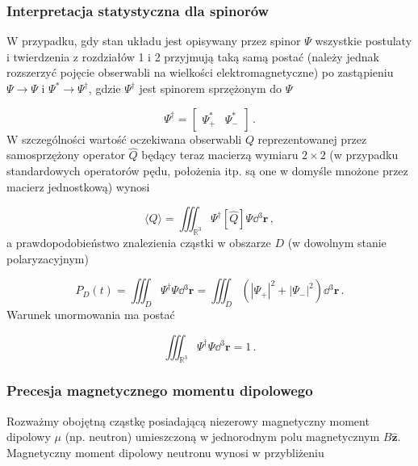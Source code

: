 \documentclass{myclass}
\begin{document}
\subsubsection{Interpretacja statystyczna dla spinorów}

W przypadku, gdy stan układu jest opisywany przez spinor \(\mathsf{\Psi}\) wszystkie postulaty i
twierdzenia z rozdziałów 1 i 2 przyjmują taką samą postać (należy jednak rozszerzyć pojęcie
obserwabli na wielkości elektromagnetyczne) po zastąpieniu \(\Psi\to\mathsf{\Psi}\) i
\(\Psi^*\to\mathsf{\Psi}^\dag\), gdzie \(\mathsf{\Psi}^\dag\) jest spinorem sprzężonym do
\(\mathsf{\Psi}\)

\begin{equation*}
\mathsf{\Psi}^\dag=\begin{bmatrix}
\Psi_+^* & \Psi_-^*
\end{bmatrix}\,.
\end{equation*}
W szczególności wartość oczekiwana obserwabli \(Q\) reprezentowanej przez samosprzężony operator
\(\hat{Q}\) będący teraz macierzą wymiaru \(2\times 2\) (w przypadku standardowych operatorów pędu,
położenia itp. są one w domyśle mnożone przez macierz jednostkową) wynosi

\begin{equation*}
\langle Q\rangle=\iiint_{\mathbb{R}^3}\mathsf{\Psi}^\dag[\hat{Q}]\mathsf{\Psi}\dd{^3\mathbf{r}}\,,
\end{equation*}
a prawdopodobieństwo znalezienia cząstki w obszarze \(D\) (w dowolnym stanie polaryzacyjnym)

\begin{equation*}
P_D(t)=\iiint_{D}\mathsf{\Psi}^\dag\mathsf{\Psi}\dd{^3\mathbf{r}}=\iiint_{D}\left(|\Psi_+|^2+|\Psi_-|^2\right)\dd{^3\mathbf{r}}\,.
\end{equation*}
Warunek unormowania ma postać

\begin{equation*}
\iiint_{\mathbb{R}^3}\mathsf{\Psi}^\dag\mathsf{\Psi}\dd{^3\mathbf{r}}=1\,.
\end{equation*}

\subsubsection{Precesja magnetycznego momentu dipolowego}

Rozważmy obojętną cząstkę posiadającą niezerowy magnetyczny moment dipolowy \(\mu\) (np. neutron)
umieszczoną w jednorodnym polu magnetycznym \(B\mathbf{\hat{z}}\). Magnetyczny moment dipolowy
neutronu wynosi w przybliżeniu
\end{document}
